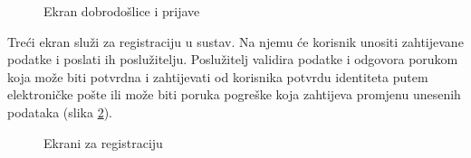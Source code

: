 \documentclass[times, utf8, zavrsni]{fer}
\begin{document}
\begin{figure}[h]
      \caption{Ekran dobrodošlice i prijave}
      \label{fig:WelcomeLogin}
\end{figure}\newpage
Treći ekran služi za registraciju u sustav. Na njemu će korisnik unositi zahtijevane podatke i
poslati ih poslužitelju. Poslužitelj validira podatke i odgovora porukom koja može biti potvrdna i zahtijevati
od korisnika potvrdu identiteta putem elektroničke pošte ili može biti poruka pogreške koja zahtijeva promjenu unesenih
podataka (slika \ref*{fig:Register}).
\begin{figure}[h]
      \centering
      \caption{Ekrani za registraciju}
      \label{fig:Register}
\end{figure}\\
\end{document}
